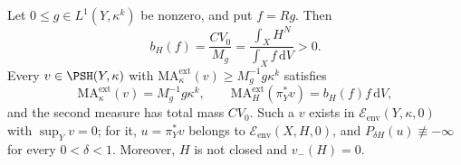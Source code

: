 \begin{theorem}\label{thm:closed-factor-product-equation}
Let $0\leq g\in L^1(Y,\kappa^k)$ be nonzero, and put $f=Rg$. Then
\[
 b_H(f)=\frac{CV_0}{M_g}=\frac{\int_XH^N}{\int_Xf\,\mathrm{d}V}>0.
\]
Every $v\in\PSH(Y,\kappa)$ with $\mathrm{MA}^{\mathrm{ext}}_\kappa(v)\geq M_g^{-1}g\kappa^k$ satisfies
\[
 \mathrm{MA}^{\mathrm{ext}}_\kappa(v)=M_g^{-1}g\kappa^k,
 \qquad
 \mathrm{MA}^{\mathrm{ext}}_H(\pi_Y^*v)=b_H(f)f\,\mathrm{d}V,
\]
and the second measure has total mass $CV_0$. Such a $v$ exists in $\mathcal E_{\mathrm{env}}(Y,\kappa,0)$ with $\sup_Yv=0$; for it, $u=\pi_Y^*v$ belongs to $\mathcal E_{\mathrm{env}}(X,H,0)$, and $P_{\delta H}(u)\not\equiv-\infty$ for every $0<\delta<1$. Moreover, $H$ is not closed and $v_-(H)=0$.
\end{theorem}

